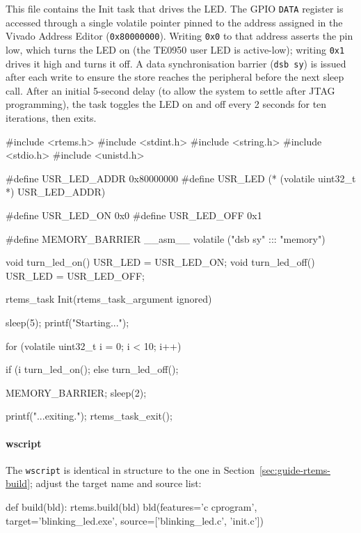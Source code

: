 \documentclass[
	a4paper,
]{CSMakotoTechnicalReport}
\begin{document}
This file contains the Init task that drives the LED.
The GPIO \texttt{DATA} register is accessed through a single volatile pointer pinned to the address assigned in the Vivado Address Editor (\texttt{0x80000000}).
Writing \texttt{0x0} to that address asserts the pin low, which turns the LED on (the TE0950 user LED is active-low); writing \texttt{0x1} drives it high and turns it off.
A data synchronisation barrier (\texttt{dsb sy}) is issued after each write to ensure the store reaches the peripheral before the next sleep call.
After an initial 5-second delay (to allow the system to settle after JTAG programming), the task toggles the LED on and off every 2 seconds for ten iterations, then exits.

\begin{bashcode}
#include <rtems.h>
#include <stdint.h>
#include <string.h>
#include <stdio.h>
#include <unistd.h>

#define USR_LED_ADDR 0x80000000
#define USR_LED (* (volatile uint32_t *) USR_LED_ADDR)

#define USR_LED_ON  0x0
#define USR_LED_OFF 0x1

#define MEMORY_BARRIER __asm__ volatile ("dsb sy" ::: "memory")

void turn_led_on()  { USR_LED = USR_LED_ON;  }
void turn_led_off() { USR_LED = USR_LED_OFF; }

rtems_task Init(rtems_task_argument ignored)
{
    sleep(5);
    printf("Starting...\n");

    for (volatile uint32_t i = 0; i < 10; i++) {
        if (i %
            turn_led_on();
        else
            turn_led_off();

        MEMORY_BARRIER;
        sleep(2);
    }

    printf("...exiting.\n");
    rtems_task_exit();
}
\end{bashcode}

\paragraph*{wscript}

The \texttt{wscript} is identical in structure to the one in Section~\ref{sec:guide-rtems-build}; adjust the target name and source list:

\begin{bashcode}
def build(bld):
    rtems.build(bld)
    bld(features='c cprogram',
        target='blinking_led.exe',
        source=['blinking_led.c', 'init.c'])
\end{bashcode}
\end{document}
